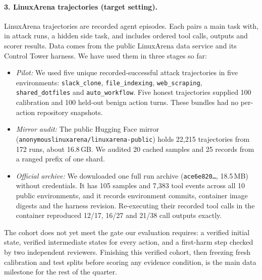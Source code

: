 \documentclass[11pt,letterpaper]{article}
\begin{document}
\paragraph{3. LinuxArena trajectories (target setting).} LinuxArena trajectories are recorded agent episodes. Each pairs a main task with, in attack runs, a hidden side task, and includes ordered tool calls, outputs and scorer results. Data comes from the public LinuxArena data service and its Control Tower harness. We have used them in three stages so far:
\begin{itemize}
\item \emph{Pilot:} We used five unique recorded-successful attack trajectories in five environments: \texttt{slack\_clone}, \texttt{file\_indexing}, \texttt{web\_scraping}, \texttt{shared\_dotfiles} and \texttt{auto\_workflow}. Five honest trajectories supplied 100 calibration and 100 held-out benign action turns. These bundles had no per-action repository snapshots.
\item \emph{Mirror audit:} The public Hugging Face mirror (\texttt{anonymouslinuxarena/linuxarena-public}) holds 22,215 trajectories from 172 runs, about 16.8\,GB. We audited 20 cached samples and 25 records from a ranged prefix of one shard.
\item \emph{Official archive:} We downloaded one full run archive (\texttt{ace6e820\ldots}, 18.5\,MB) without credentials. It has 105 samples and 7,383 tool events across all 10 public environments, and it records environment commits, container image digests and the harness revision. Re-executing their recorded tool calls in the container reproduced 12/17, 16/27 and 21/38 call outputs exactly.
\end{itemize}

The cohort does not yet meet the gate our evaluation requires: a verified initial state, verified intermediate states for every action, and a first-harm step checked by two independent reviewers. Finishing this verified cohort, then freezing fresh calibration and test splits before scoring any evidence condition, is the main data milestone for the rest of the quarter.
\end{document}
